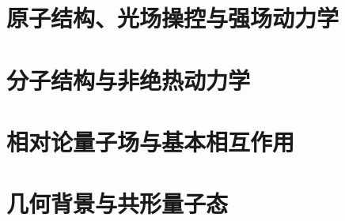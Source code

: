 \part{原子结构、光场操控与强场动力学}










\part{分子结构与非绝热动力学}







\part{相对论量子场与基本相互作用}

















\part{几何背景与共形量子态}



\backmatter
\begingroup\sloppy
\printbibliography[heading=bibintoc,title={参考文献}]
\endgroup
